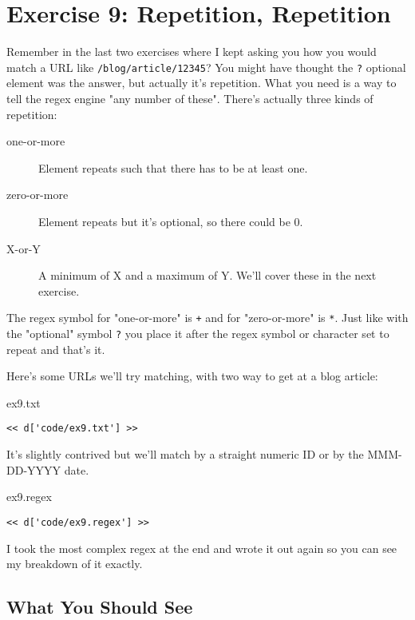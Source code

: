 \chapter{Exercise 9: Repetition, Repetition}

Remember in the last two exercises where I kept asking you how you would match
a URL like \verb|/blog/article/12345|? You might have thought the \verb|?| optional
element was the answer, but actually it's repetition.  What you need is a way to
tell the regex engine "any number of these".  There's actually three kinds of
repetition:

\begin{description}
\item[one-or-more] Element repeats such that there has to be at least one.
\item[zero-or-more] Element repeats but it's optional, so there could be 0.
\item[X-or-Y] A minimum of X and a maximum of Y. We'll cover these in the next
    exercise.
\end{description}

The regex symbol for "one-or-more" is \verb|+| and for "zero-or-more" is \verb|*|.
Just like with the "optional" symbol \verb|?| you place it after the regex
symbol or character set to repeat and that's it.

Here's some URLs we'll try matching, with two way to get at a blog article:

\begin{code}{ex9.txt}
\begin{Verbatim}
<< d['code/ex9.txt'] >>
\end{Verbatim}
\end{code}

It's slightly contrived but we'll match by a straight numeric ID or by
the MMM-DD-YYYY date.

\begin{code}{ex9.regex}
\begin{Verbatim}
<< d['code/ex9.regex'] >>
\end{Verbatim}
\end{code}

I took the most complex regex at the end and wrote it out again so you
can see my breakdown of it exactly.

\section{What You Should See}

